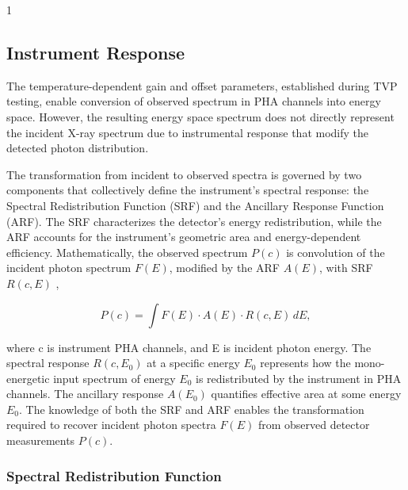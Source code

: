 \documentclass[12pt]{spieman}  %
\begin{document}
\begin{spacing}{1}
\subsection{Instrument Response}\label{section:instrument_response}

The temperature-dependent gain and offset parameters, established during TVP testing, enable conversion of observed spectrum in PHA channels into energy space. However, the resulting energy space spectrum does not directly represent the incident X-ray spectrum due to instrumental response that modify the detected photon distribution.
	
The transformation from incident to observed spectra is governed by two components that collectively define the instrument's spectral response: the Spectral Redistribution Function (SRF) and the Ancillary Response Function (ARF). 
The SRF characterizes the detector's energy redistribution, while the ARF accounts for the instrument's geometric area and energy-dependent efficiency. Mathematically, the observed spectrum $P(c)$ is convolution of the incident photon spectrum $F(E)$, modified by the ARF $A(E)$, with SRF $R(c,E)$ \cite{xspec_guide},


\begin{equation} \label{eq:response}
P(c) = \int F(E) \cdot A(E) \cdot R(c, E) \, dE ,
\end{equation}

where c is instrument PHA channels, and E is incident photon energy. The spectral response $R(c,E_0)$ at a specific energy $E_0$ represents how the mono-energetic input spectrum of energy $E_0$ is redistributed by the instrument in PHA channels. The ancillary response $A(E_0)$ quantifies effective area at some energy $E_0$. The knowledge of both the SRF and ARF enables the transformation required to recover incident photon spectra $F(E)$ from observed detector measurements $P(c)$.

\subsubsection{Spectral Redistribution Function}



\end{spacing}
\end{document}
